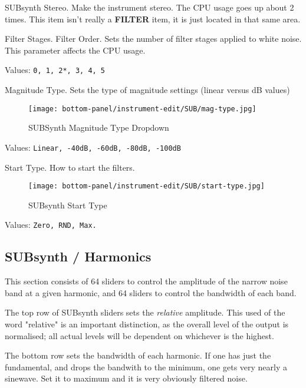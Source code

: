    SUBsynth Stereo.
   Make the instrument stereo. The CPU usage goes up about 2 times.
   This item isn't really a \textbf{FILTER} item, it is just located in that
   same area.

   Filter Stages.  Filter Order.
   Sets the number of filter stages applied to white noise. This parameter
   affects the CPU usage.

   Values: \texttt{0, 1, 2*, 3, 4, 5}

   Magnitude Type.
   Sets the type of magnitude settings (linear versus dB values)

\begin{figure}[H]
   \centering
   \texttt{[image: bottom-panel/instrument-edit/SUB/mag-type.jpg]}
   \caption{SUBSynth Magnitude Type Dropdown}
   \label{fig:subsynth_magnitude_type_dropdown}
\end{figure}

   Values: \texttt{Linear, -40dB, -60dB, -80dB, -100dB}

   Start Type.
   How to start the filters.

\begin{figure}[H]
   \centering
   \texttt{[image: bottom-panel/instrument-edit/SUB/start-type.jpg]}
   \caption{SUBsynth Start Type}
   \label{fig:subsynth_start_type}
\end{figure}

   Values: \texttt{Zero, RND, Max.}

\subsection{SUBsynth / Harmonics}
\label{subsec:subsynth_harmonics}

   This section consists of 64 sliders to control the amplitude of the narrow
   noise band at a given harmonic, and 64 sliders to control the bandwidth of
   each band.

   The top row of SUBsynth sliders sets the \textsl{relative} amplitude.  This
   used of the word "relative" is an important distinction, as the overall level
   of the output is normalised; all actual levels will be dependent on whichever
   is the highest.

   The bottom row sets the bandwidth of each harmonic. If one has just the
   fundamental, and drops the bandwith to the minimum, one gets very nearly a
   sinewave.  Set it to maximum and it is very obviously filtered noise.


